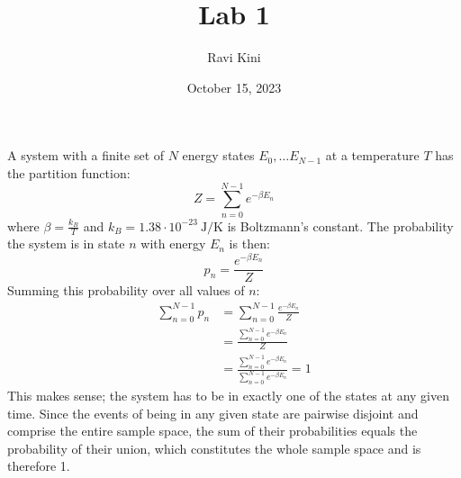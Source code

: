 \documentclass{article}
\title{Lab 1}
\author{Ravi Kini}
\date{October 15, 2023}
\begin{document}
\maketitle


\problem
A system with a finite set of $N$ energy states $E_0, \ldots E_{N-1}$ at a temperature $T$ has the partition function:
\begin{equation}
    Z = \sum_{n = 0}^{N - 1} e^{-\beta E_n}
\end{equation}
where $\beta = \frac{k_B}{T}$ and $k_B = 1.38 \cdot 10^{-23}~\unit{\joule\per\kelvin}$ is Boltzmann's constant. The probability the system is in state $n$ with energy $E_n$ is then:
\begin{equation}
    p_n = \frac{e^{-\beta E_n}}{Z}
\end{equation}
Summing this probability over all values of $n$:
\begin{equation}
    \begin{split}
        \sum_{n=0}^{N-1} p_n & = \sum_{n=0}^{N-1} \frac{e^{-\beta E_n}}{Z} \\
        & = \frac{\sum_{n=0}^{N-1} e^{-\beta E_n}}{Z} \\
        & = \frac{\sum_{n=0}^{N-1} e^{-\beta E_n}}{\sum_{n=0}^{N-1} e^{-\beta E_n}} = 1
    \end{split}
\end{equation}
This makes sense; the system has to be in exactly one of the states at any given time. Since the events of being in any given state are pairwise disjoint and comprise the entire sample space, the sum of their probabilities equals the probability of their union, which constitutes the whole sample space and is therefore 1.

\clearpage
\end{document}
